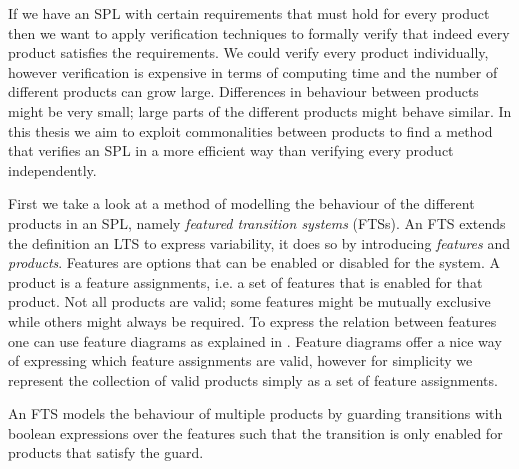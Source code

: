 If we have an SPL with certain requirements that must hold for every product then we want to apply verification techniques to formally verify that indeed every product satisfies the requirements. We could verify every product individually, however verification is expensive in terms of computing time and the number of different products can grow large. Differences in behaviour between products might be very small; large parts of the different products might behave similar. In this thesis we aim to exploit commonalities between products to find a method that verifies an SPL in a more efficient way than verifying every product independently.

First we take a look at a method of modelling the behaviour of the different products in an SPL, namely \textit{featured transition systems} (FTSs). An FTS extends the definition an LTS to express variability, it does so by introducing \textit{features} and \textit{products}. Features are options that can be enabled or disabled for the system. A product is a feature assignments, i.e. a set of features that is enabled for that product. Not all products are valid; some features might be mutually exclusive while others might always be required. To express the relation between features one can use feature diagrams as explained in \cite{Classen2013FeaturedTS}. Feature diagrams offer a nice way of expressing which feature assignments are valid, however for simplicity we represent the collection of valid products simply as a set of feature assignments. 

An FTS models the behaviour of multiple products by guarding transitions with boolean expressions over the features such that the transition is only enabled for products that satisfy the guard.

